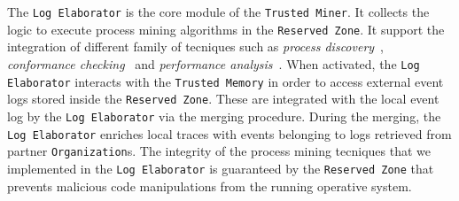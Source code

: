 The \texttt{Log Elaborator} is the core module of the \texttt{Trusted Miner}. It collects the logic to execute process mining algorithms in the \texttt{Reserved Zone}. It support the integration of different family of tecniques such as \textit{process discovery}~\cite{citation}, \textit{conformance checking}~\cite{citation} and \textit{performance analysis}~\cite{ciation}. When activated, the \texttt{Log Elaborator} interacts with the \texttt{Trusted Memory} in order to access external event logs stored inside the \texttt{Reserved Zone}. These are integrated with the local event log by the \texttt{Log Elaborator} via the merging procedure. During the merging, the \texttt{Log Elaborator} enriches local traces with events belonging to logs retrieved from partner \texttt{Organization}s. The integrity of the process mining tecniques that we implemented in the \texttt{Log Elaborator} is guaranteed by the \texttt{Reserved Zone} that prevents malicious code manipulations from the running operative system.

